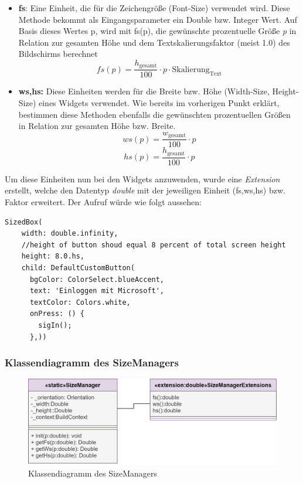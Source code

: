 \begin{itemize}
    \item{\textbf{fs}:} Eine Einheit, die für die Zeichengröße (Font-Size) verwendet wird. Diese Methode bekommt als Eingangsparameter ein Double bzw. Integer Wert. Auf Basis dieses Wertes p, wird mit fs(p), die gewünschte prozentuelle Größe {\textit{p}} in Relation zur gesamten Höhe und dem Textskalierungsfaktor (meist 1.0) des Bildschirms berechnet  
    \[fs(p)=\frac{h_{\text{gesamt}}}{100} \cdot p \cdot \text{Skalierung}_{\text{Text}} \] 
    \item \textbf{ws,hs:} Diese Einheiten werden für die Breite bzw. Höhe (Width-Size, Height-Size) eines Widgets verwendet. Wie bereits im vorherigen Punkt erklärt, bestimmen diese Methoden ebenfalls die gewünschten prozentuellen Größen in Relation zur gesamten Höhe bzw. Breite.  
     \[ws(p)=\frac{w_{\text{gesamt}}}{100} \cdot p\] 
      \[hs(p)=\frac{h_{\text{gesamt}}}{100} \cdot p\] 
\end{itemize}
\newpage
Um diese Einheiten nun bei den Widgets anzuwenden, wurde eine {\textit{Extension}} erstellt, welche den Datentyp {\textit{double}} mit der jeweiligen Einheit (fs,ws,hs) bzw. Faktor erweitert. Der Aufruf würde wie folgt aussehen:

\begin{lstlisting}[caption=Buttonhöhe entspricht 8\% der gesamten Bildschirmhöhe,style=goMono]
SizedBox(
    width: double.infinity,
    //height of button shoud equal 8 percent of total screen height
    height: 8.0.hs,
    child: DefaultCustomButton(
      bgColor: ColorSelect.blueAccent,
      text: 'Einloggen mit Microsoft',
      textColor: Colors.white,
      onPress: () {
        sigIn();
      },))
\end{lstlisting}


\subsubsection{Klassendiagramm des SizeManagers}
\begin{figure}[h!]
\centering
\includegraphics[width=1\textwidth]{FLUTTER/images/GP/SizeManagerKlassen.png}
\caption{Klassendiagramm des SizeManagers}
\end{figure}

